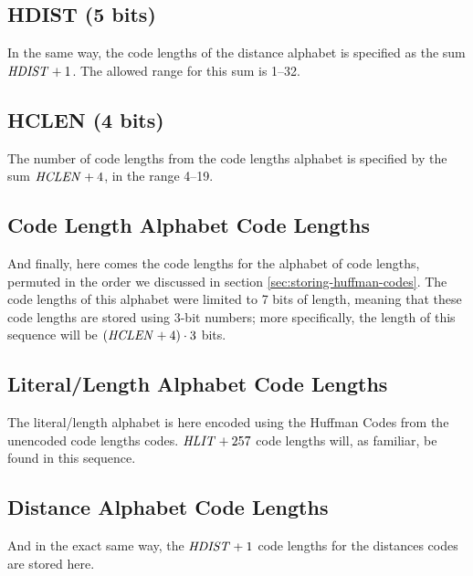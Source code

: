 \subsection{HDIST (5 bits)}

In the same way, the code lengths of the distance alphabet is
specified as the sum $\mathit{HDIST} + 1$. The allowed range for this sum
is 1--32.


\subsection{HCLEN (4 bits)}

The number of code lengths from the code lengths alphabet is specified
by the sum $\mathit{HCLEN} + 4$, in the range 4--19.

\subsection{Code Length Alphabet Code Lengths}

And finally, here comes the code lengths for the alphabet of code
lengths, permuted in the order we discussed in section
\ref{sec:storing-huffman-codes}. The code lengths of this alphabet
were limited to 7 bits of length, meaning that these code lengths are
stored using 3-bit numbers; more specifically, the length of this
sequence will be $(\mathit{HCLEN} + 4) \cdot 3$ bits.

\subsection{Literal/Length Alphabet Code Lengths}

The literal/length alphabet is here encoded using the Huffman Codes
from the unencoded code lengths codes. $\mathit{HLIT} + 257$ code lengths
will, as familiar, be found in this sequence.

\subsection{Distance Alphabet Code Lengths}

And in the exact same way, the $\mathit{HDIST} + 1$ code lengths for the
distances codes are stored here.
